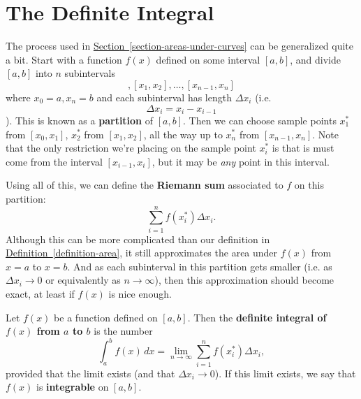 \documentclass[10pt,]{book}
\newcommand{\terminology}[1]{\textbf{#1}}
\theoremstyle{ptxplainnotitle}
\theoremstyle{ptxplaintitle}
\theoremstyle{ptxplainnotitle}
\theoremstyle{ptxplaintitle}
\theoremstyle{ptxplainnotitle}
\theoremstyle{ptxplaintitle}
\theoremstyle{ptxdefinitionnotitle}
\theoremstyle{ptxdefinitiontitle}
\theoremstyle{ptxdefinitionnotitle}
\theoremstyle{ptxdefinitiontitle}
\theoremstyle{ptxdefinitionnotitle}
\theoremstyle{ptxdefinitiontitle}
\theoremstyle{ptxdefinitionnotitle}
\theoremstyle{ptxdefinitiontitle}
\theoremstyle{ptxdefinitionnotitle}
\theoremstyle{ptxdefinitiontitle}
\numberwithin{equation}{section}
\begin{document}
\section[{The Definite Integral}]{The Definite Integral}\label{section-the-definite-integral}
\hypertarget{p-425}{}%
The process used in \hyperref[section-areas-under-curves]{Section~\ref{section-areas-under-curves}} can be generalized quite a bit. Start with a function \(f(x)\) defined on some interval \([a,b]\), and divide \([a,b]\) into \(n\) subintervals%
\begin{equation*}
[x_{0},x_{1}], [x_{1},x_{2}],\ldots,[x_{n-1},x_{n}]
\end{equation*}
where \(x_{0} = a, x_{n} = b\) and each subinterval has length \(\Delta x_{i}\) (i.e.%
\begin{equation*}
\Delta x_{i} = x_{i} - x_{i-1}
\end{equation*}
). This is known as a \terminology{partition} of \([a,b]\). Then we can choose sample points \(x_{1}^{*}\) from \([x_{0},x_{1}]\), \(x_{2}^{*}\) from \([x_{1},x_{2}]\), all the way up to \(x_{n}^{*}\) from \([x_{n-1},x_{n}]\). Note that the only restriction we're placing on the sample point \(x_{i}^{*}\) is that is must come from the interval \([x_{i-1},x_{i}]\), but it may be \emph{any} point in this interval.%
\par
\hypertarget{p-426}{}%
Using all of this, we can define the \terminology{Riemann sum} associated to \(f\) on this partition:%
\begin{equation*}
\sum_{i=1}^{n}f(x_{i}^{*})\Delta x_{i}.
\end{equation*}
Although this can be more complicated than our definition in \hyperref[definition-area]{Definition~\ref{definition-area}}, it still approximates the area under \(f(x)\) from \(x=a\) to \(x=b\). And as each subinterval in this partition gets smaller (i.e. as \(\Delta x_{i}\to0\) or equivalently as \(n\to\infty\)), then this approximation should become exact, at least if \(f(x)\) is nice enough.%
\begin{definition}\label{definition-the-definite-integral}
\hypertarget{p-427}{}%
Let \(f(x)\) be a function defined on \([a,b]\). Then the \terminology{definite integral of \(f(x)\) from \(a\) to \(b\)} is the number%
\begin{equation*}
\int_{a}^{b}f(x)\,dx = \lim_{n\to\infty}\sum_{i=1}^{n}f(x_{i}^{*})\Delta x_{i},
\end{equation*}
provided that the limit exists (and that \(\Delta x_{i}\to0\)). If this limit exists, we say that \(f(x)\) is \terminology{integrable} on \([a,b]\).%
\end{definition}
\end{document}
